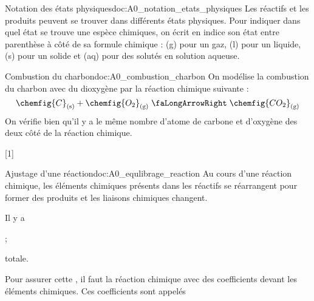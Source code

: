 \begin{doc}{Notation des états physiques}{doc:A0_notation_etats_physiques}
  Les réactifs et les produits peuvent se trouver dans différents états physiques.
  Pour indiquer dans quel état se trouve une espèce chimiques, on écrit en indice son état entre parenthèse à côté de sa formule chimique : (g) pour un gaz, (l) pour un liquide, (s) pour un solide et (aq) pour des solutés en solution aqueuse.
\end{doc}


\begin{doc}{Combustion du charbon}{doc:A0_combustion_charbon}
  On modélise la combustion du charbon avec du dioxygène par la réaction chimique suivante :
  \begin{equation*}
    \chemfig{C}\sol + \chemfig{O_2}\gaz \reaction \chemfig{CO_2}\gaz
  \end{equation*}
  On vérifie bien qu'il y a le même nombre d'atome de carbone et d'oxygène des deux côté de la réaction chimique.
\end{doc}


[1]


\begin{doc}{Ajustage d'une réaction}{doc:A0_equlibrage_reaction}
  Au cours d'une réaction chimique, les éléments chimiques présents dans les réactifs se réarrangent pour former des produits et les liaisons chimiques changent.
  \begin{importants}
    Il y a  
    \begin{listePoints}
      \item {} ;
      \item {} totale.
    \end{listePoints}
  \end{importants}
  \begin{importants}
    Pour assurer cette , il faut  la réaction chimique avec des coefficients devant les éléments chimiques.
    Ces coefficients sont appelés 
  \end{importants}
\end{doc}


